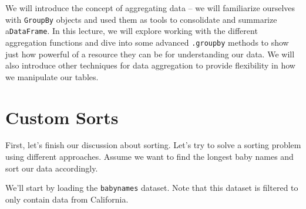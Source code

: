 \documentclass[
  letterpaper,
  DIV=11,
  numbers=noendperiod]{scrreprt}
\begin{document}
We will introduce the concept of aggregating data -- we will familiarize
ourselves with \texttt{GroupBy} objects and used them as tools to
consolidate and summarize a\texttt{DataFrame}. In this lecture, we will
explore working with the different aggregation functions and dive into
some advanced \texttt{.groupby} methods to show just how powerful of a
resource they can be for understanding our data. We will also introduce
other techniques for data aggregation to provide flexibility in how we
manipulate our tables.

\section{Custom Sorts}\label{custom-sorts}

First, let's finish our discussion about sorting. Let's try to solve a
sorting problem using different approaches. Assume we want to find the
longest baby names and sort our data accordingly.

We'll start by loading the \texttt{babynames} dataset. Note that this
dataset is filtered to only contain data from California.
\end{document}
